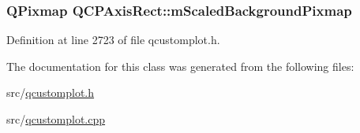 \hypertarget{class_q_c_p_axis_rect_aa74b9415598d59b49290e41e42d7ee27}{
\subsubsection[{m\-Scaled\-Background\-Pixmap}]{\setlength{\rightskip}{0pt plus 5cm}Q\-Pixmap Q\-C\-P\-Axis\-Rect\-::m\-Scaled\-Background\-Pixmap\hspace{0.3cm}{\ttfamily [protected]}}}\label{class_q_c_p_axis_rect_aa74b9415598d59b49290e41e42d7ee27}


Definition at line 2723 of file qcustomplot.\-h.



The documentation for this class was generated from the following files\-:\begin{DoxyCompactItemize}
\item 
src/\hyperlink{qcustomplot_8h}{qcustomplot.\-h}\item 
src/\hyperlink{qcustomplot_8cpp}{qcustomplot.\-cpp}\end{DoxyCompactItemize}
